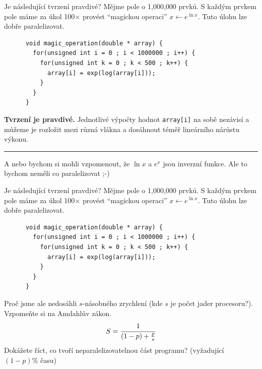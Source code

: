 \documentclass[usenames,dvipsnames,9pt]{beamer}
\newcommand{\see}[1]{\faEye\hspace{5pt}#1}
\begin{document}
{
\setbeamertemplate{frame footer}{\see{{\tt magic.cpp}}}
\begin{frame}[fragile,t]
  \vspace{1em}
  \begin{block}{Je následující tvrzení pravdivé?}
    Mějme pole o 1,000,000 prvků.
    S každým prvkem pole máme za úkol 100$\times$ provést ``magickou operaci'' $x \gets e^{\ln x}$.
    Tuto úlohu lze dobře paralelizovat.

    \begin{verbatim}
      void magic_operation(double * array) {
        for(unsigned int i = 0 ; i < 1000000 ; i++) {
          for(unsigned int k = 0 ; k < 500 ; k++) {
            array[i] = exp(log(array[i]));
          }
        }
      }
    \end{verbatim}
  \end{block}
  \pause
  \textcolor{OliveGreen}{\bf Tvrzení je pravdivé.}
  Jednotlivé výpočty hodnot \texttt{array[i]} na sobě nezávisí a můžeme je rozložit mezi různá vlákna a dosáhnout téměř lineárního nárůstu výkonu.

  \pause
  \vspace{1em}
  \hrule

  \footnotesize
  A nebo bychom si mohli vzpomenout, že $\ln x$ a $e^x$ jsou inverzní funkce.
  Ale to bychom neměli co paralelizovat ;-)
\end{frame}
\begin{frame}[fragile,t]
  \vspace{1em}
  \begin{block}{Je následující tvrzení pravdivé?}
    Mějme pole o 1,000,000 prvků.
    S každým prvkem pole máme za úkol 100$\times$ provést ``magickou operaci'' $x \gets e^{\ln x}$.
    Tuto úlohu lze dobře paralelizovat.

    \begin{verbatim}
      void magic_operation(double * array) {
        for(unsigned int i = 0 ; i < 1000000 ; i++) {
          for(unsigned int k = 0 ; k < 500 ; k++) {
            array[i] = exp(log(array[i]));
          }
        }
      }
    \end{verbatim}
  \end{block}
  
  Proč jsme ale nedosáhli $s$-násobného zrychlení (kde $s$ je počet jader procesoru?).
  Vzpomeňte si na Amdahlův zákon.
  \[ S = \cfrac{1}{(1-p) + \frac{p}{s}} \]
  Dokážete říct, co tvoří neparalelizovatelnou část programu? (vyžadující $(1-p)\%$ času)
\end{frame}
}
\end{document}
